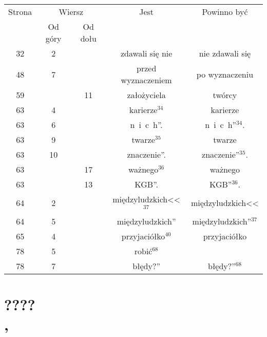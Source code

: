 \documentclass[a4paper,11pt]{article}
\numberwithin{equation}{section}
\begin{document}
\begin{center}

  \begin{tabular}{|c|c|c|c|c|}
    \hline
    Strona & \multicolumn{2}{c|}{Wiersz} & Jest
                              & Powinno być \\ \cline{2-3}
    & Od góry & Od dołu & & \\
    \hline
    32 &  2 & & zdawali się nie & nie zdawali się \\
    48 &  7 & & przed wyznaczeniem & po wyznaczeniu \\
    59 & & 11 & założyciela & twórcy \\
    63 &  4 & & karierze$^{ 34 }$ & karierze \\
    63 &  6 & & n~i~c~h”. & n~i~c~h”$^{ 34 }$. \\
    63 &  9 & & twarze$^{ 35 }$ & twarze \\
    63 & 10 & & znaczenie”. & znaczenie”$^{ 35 }$. \\
    63 & & 17 & ważnego$^{ 36 }$ & ważnego \\
    63 & & 13 & KGB”. & KGB”$^{ 36 }$. \\
    64 &  2 & & międzyludzkich<<$^{ 37 }$ & międzyludzkich<< \\
    64 &  5 & & międzyludzkich” & międzyludzkich”$^{ 37 }$ \\
    65 &  4 & & przyjaciółko$^{ 40 }$ & przyjaciółko \\
    78 &  5 & & robić$^{ 68 }$ & \\
    78 &  7 & & błędy?” & błędy?”$^{ 68 }$ \\
    \hline
  \end{tabular}

\end{center}

\VerSpaceTwo












\section{ %
  ???? \\
  , \cite{}}
\end{document}
